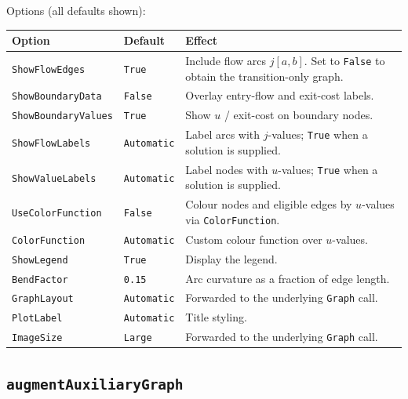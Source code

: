 \documentclass[11pt]{article}
\begin{document}
Options (all defaults shown):

\begin{center}
\renewcommand{\arraystretch}{1.2}
\begin{longtable}{@{}p{4.2cm} p{2.4cm} p{8.4cm}@{}}
\toprule
\textbf{Option} & \textbf{Default} & \textbf{Effect} \\
\midrule
\endhead
\texttt{ShowFlowEdges}      & \texttt{True}  & Include flow arcs $j[a, b]$. Set to \texttt{False} to obtain the transition-only graph. \\
\texttt{ShowBoundaryData}   & \texttt{False} & Overlay entry-flow and exit-cost labels. \\
\texttt{ShowBoundaryValues} & \texttt{True}  & Show $u$ / exit-cost on boundary nodes. \\
\texttt{ShowFlowLabels}     & \texttt{Automatic} & Label arcs with $j$-values; \texttt{True} when a solution is supplied. \\
\texttt{ShowValueLabels}    & \texttt{Automatic} & Label nodes with $u$-values; \texttt{True} when a solution is supplied. \\
\texttt{UseColorFunction}   & \texttt{False} & Colour nodes and eligible edges by $u$-values via \texttt{ColorFunction}. \\
\texttt{ColorFunction}      & \texttt{Automatic} & Custom colour function over $u$-values. \\
\texttt{ShowLegend}         & \texttt{True}  & Display the legend. \\
\texttt{BendFactor}         & \texttt{0.15}  & Arc curvature as a fraction of edge length. \\
\texttt{GraphLayout}        & \texttt{Automatic} & Forwarded to the underlying \texttt{Graph} call. \\
\texttt{PlotLabel}          & \texttt{Automatic} & Title styling. \\
\texttt{ImageSize}          & \texttt{Large} & Forwarded to the underlying \texttt{Graph} call. \\
\bottomrule
\end{longtable}
\end{center}

\subsection*{\texttt{augmentAuxiliaryGraph}}
\end{document}

